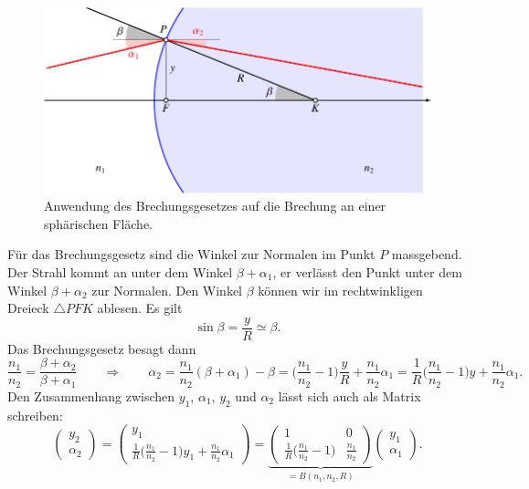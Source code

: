 \begin{figure}
\centering
\includegraphics{applications/matrixoptik/curve.pdf}
\caption{Anwendung des Brechungsgesetzes auf die Brechung an einer
sphärischen Fläche.
\label{mo:Bmatrix}}
\end{figure}
Für das Brechungsgesetz sind die Winkel zur Normalen im Punkt $P$
massgebend.
Der Strahl kommt an unter dem Winkel $\beta+\alpha_1$, er verlässt den
Punkt unter dem Winkel $\beta+\alpha_2$ zur Normalen.
Den Winkel $\beta$ können wir im rechtwinkligen Dreieck $\triangle PFK$
ablesen.
Es gilt 
\[
\sin \beta = \frac{y}{R} \simeq \beta.
\]
Das Brechungsgesetz besagt dann
\[
\frac{n_1}{n_2}
=
\frac{\beta+\alpha_2}{\beta+\alpha_1}
\qquad\Rightarrow\qquad
\alpha_2
=
\frac{n_1}{n_2}(\beta+\alpha_1)
-\beta
=
\biggl(
\frac{n_1}{n_2}-1
\biggr)
\frac{y}{R}
+
\frac{n_1}{n_2}\alpha_1
=
\frac{1}{R}
\biggl(
\frac{n_1}{n_2}-1
\biggr)
y
+
\frac{n_1}{n_2}\alpha_1.
\]
Den Zusammenhang zwischen $y_1$, $\alpha_1$, $y_2$ und $\alpha_2$ lässt
sich auch als Matrix schreiben:
\[
\begin{pmatrix}
y_2\\\alpha_2
\end{pmatrix}
=
\begin{pmatrix}
y_1
\\
\displaystyle\frac{1}{R}\biggl(\frac{n_1}{n_2}-1\biggr) y_1
	+ \frac{n_1}{n_2}\alpha_1
\end{pmatrix}
=
\underbrace{
\begin{pmatrix}
1&0\\
\displaystyle\frac{1}{R}\biggl(\frac{n_1}{n_2}-1\biggr)
	& \displaystyle\frac{n_1}{n_2}
\end{pmatrix}
}_{\displaystyle =B(n_1,n_2,R)}
\begin{pmatrix}y_1\\\alpha_1\end{pmatrix}.
\]

